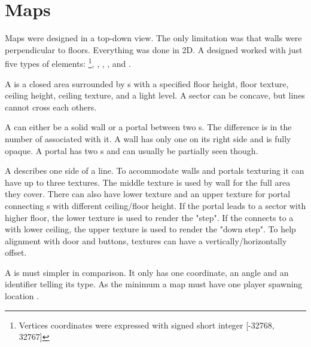 

\section{Maps}
Maps were designed in a top-down view. The only limitation was that walls were perpendicular to floors. Everything was done in 2D. A designed worked with just five types of elements: \footnote{Vertices coordinates were expressed with signed short integer [-32768, 32767]}, , , , and .\\
\par
{}

\par
A  is a closed area surrounded by s with a specified floor height, floor texture, ceiling height, ceiling texture, and a light level. A sector can be concave, but lines cannot cross each others.\\
\par
A  can either be a solid wall or a portal between two s. The difference is in the number of  associated with it. A wall has only one  on its right side and is fully opaque. A portal has two s and can usually be partially seen though.\\
\par
A  describes one side of a line. To accommodate walls and portals texturing it can have up to three textures. The middle texture is used by wall for the full area they cover. There can also have lower texture and an upper texture for portal connecting s with different ceiling/floor height. If the portal leads to a sector with higher floor, the lower texture is used to render the "step". If the  connects to a  with lower ceiling, the upper texture is used to render the "down step". To help alignment with door and buttons,  textures can have a vertically/horizontally offset. \\
\par
A  is must simpler in comparison. It only has one  coordinate, an angle and an identifier telling its type. As the minimum a map must have one player spawning location .\\

